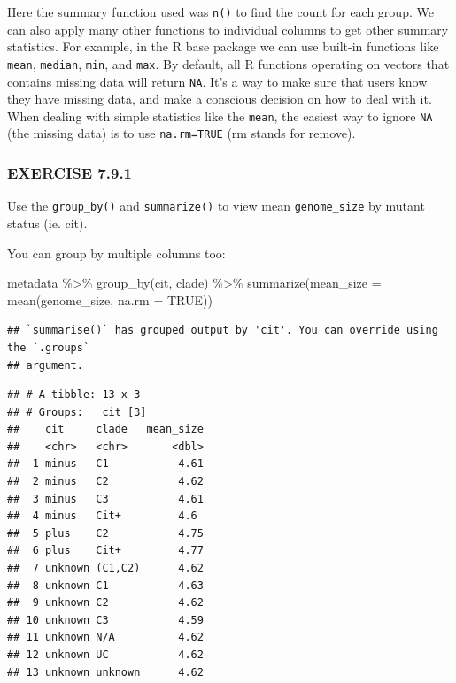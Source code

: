 \documentclass[
]{book}
\newenvironment{Shaded}{\begin{snugshade}}{\end{snugshade}}
\newcommand{\AttributeTok}[1]{\textcolor[rgb]{0.77,0.63,0.00}{#1}}
\newcommand{\ConstantTok}[1]{\textcolor[rgb]{0.00,0.00,0.00}{#1}}
\newcommand{\FunctionTok}[1]{\textcolor[rgb]{0.00,0.00,0.00}{#1}}
\newcommand{\NormalTok}[1]{#1}
\newcommand{\SpecialCharTok}[1]{\textcolor[rgb]{0.00,0.00,0.00}{#1}}
\begin{document}
Here the summary function used was \texttt{n()} to find the count for each group. We can also apply many other functions to individual columns to get other summary statistics. For example, in the R base package we can use built-in functions like \texttt{mean}, \texttt{median}, \texttt{min}, and \texttt{max}. By default, all R functions operating on vectors that contains missing data will return \texttt{NA}. It's a way to make sure that users know they have missing data, and make a conscious decision on how to deal with it. When dealing with simple statistics like the \texttt{mean}, the easiest way to ignore \texttt{NA} (the missing data) is to use \texttt{na.rm=TRUE} (rm stands for remove).

\hypertarget{exercise-7.9.1}{%
\subsubsection*{EXERCISE 7.9.1}\label{exercise-7.9.1}}

Use the \texttt{group\_by()} and \texttt{summarize()} to view mean \texttt{genome\_size} by mutant status (ie. cit).

You can group by multiple columns too:

\begin{Shaded}
\begin{Highlighting}[]
\NormalTok{metadata }\SpecialCharTok{\%\textgreater{}\%}
  \FunctionTok{group\_by}\NormalTok{(cit, clade) }\SpecialCharTok{\%\textgreater{}\%}
  \FunctionTok{summarize}\NormalTok{(}\AttributeTok{mean\_size =} \FunctionTok{mean}\NormalTok{(genome\_size, }\AttributeTok{na.rm =} \ConstantTok{TRUE}\NormalTok{))}
\end{Highlighting}
\end{Shaded}

\begin{verbatim}
## `summarise()` has grouped output by 'cit'. You can override using the `.groups`
## argument.
\end{verbatim}

\begin{verbatim}
## # A tibble: 13 x 3
## # Groups:   cit [3]
##    cit     clade   mean_size
##    <chr>   <chr>       <dbl>
##  1 minus   C1           4.61
##  2 minus   C2           4.62
##  3 minus   C3           4.61
##  4 minus   Cit+         4.6 
##  5 plus    C2           4.75
##  6 plus    Cit+         4.77
##  7 unknown (C1,C2)      4.62
##  8 unknown C1           4.63
##  9 unknown C2           4.62
## 10 unknown C3           4.59
## 11 unknown N/A          4.62
## 12 unknown UC           4.62
## 13 unknown unknown      4.62
\end{verbatim}
\end{document}
